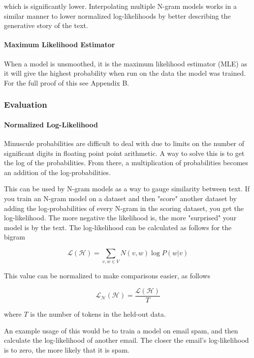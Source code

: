 \documentclass[11pt]{article}
\begin{document}
which is significantly lower. Interpolating multiple N-gram models works in a similar manner to lower normalized log-likelihoods by better describing the generative story of the text.

\paragraph{Maximum Likelihood Estimator}

When a model is unsmoothed, it is the maximum likelihood estimator (MLE) as it will give the highest probability when run on the data the model was trained. For the full proof of this see Appendix B.

\subsubsection{Evaluation}

\paragraph{Normalized Log-Likelihood}

Minuscule probabilities are difficult to deal with due to limits on the number of significant digits in floating point point arithmetic. A way to solve this is to get the log of the probabilities. From there, a multiplication of probabilities becomes an addition of the log-probabilities.

This can be used by N-gram models as a way to gauge similarity between text. If you train an N-gram model on a dataset and then "score" another dataset by adding the log-probabilities of every N-gram in the scoring dataset, you get the log-likelihood. The more negative the likelihood is, the more "surprised" your model is by the text. The log-likelihood can be calculated as follows for the bigram

$$ \mathcal{L}\left(\mathcal{H}\right) = \sum\limits_{v, w \in V} N\left(v, w \right) \log P\left(w \vert v \right) $$

This value can be normalized to make comparisons easier, as follows

$$ \mathcal{L}_\mathcal{N}\left(\mathcal{H}\right) = \frac{ \mathcal{L}\left(\mathcal{H}\right) }{T} $$

where $T$ is the number of tokens in the held-out data.

An example usage of this would be to train a model on email spam, and then calculate the log-likelihood of another email. The closer the email's log-likelihood is to zero, the more likely that it is spam.
\end{document}
